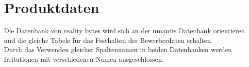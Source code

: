 \section{Produktdaten}

    Die Datenbank von reality bytes wird sich an der umantis Datenbank orientieren und die gleiche Tabele für das Festhalten der Bewerberdaten erhalten. \\
    Durch das Verwenden gleicher Spaltennamen in beiden Datenbanken werden Irritationen mit verschiedenen Namen ausgeschlossen.
